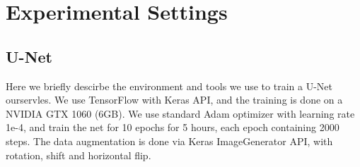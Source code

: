 \section{Experimental Settings}
\subsection{U-Net}
Here we briefly descirbe the environment and tools we use to train a U-Net ourservles. We use TensorFlow with Keras API, and the training is done on a NVIDIA GTX 1060 (6GB). We use standard Adam optimizer with learning rate 1e-4, and train the net for 10 epochs for 5 hours, each epoch containing 2000 steps. The data augmentation is done via Keras ImageGenerator API, with rotation, shift and horizontal flip.